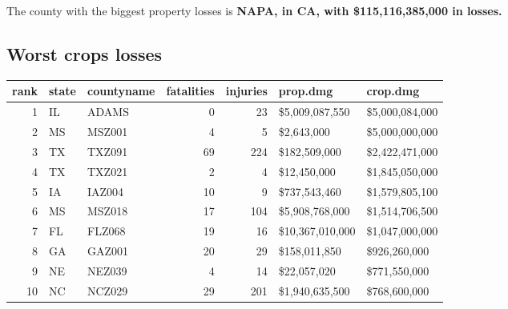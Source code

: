 \documentclass[]{article}
\newenvironment{Shaded}{\begin{snugshade}}{\end{snugshade}}
\newcommand{\KeywordTok}[1]{\textcolor[rgb]{0.13,0.29,0.53}{\textbf{{#1}}}}
\newcommand{\DataTypeTok}[1]{\textcolor[rgb]{0.13,0.29,0.53}{{#1}}}
\newcommand{\DecValTok}[1]{\textcolor[rgb]{0.00,0.00,0.81}{{#1}}}
\newcommand{\StringTok}[1]{\textcolor[rgb]{0.31,0.60,0.02}{{#1}}}
\newcommand{\CommentTok}[1]{\textcolor[rgb]{0.56,0.35,0.01}{\textit{{#1}}}}
\newcommand{\NormalTok}[1]{{#1}}
\begin{document}
The county with the biggest property losses is \textbf{NAPA, in CA, with
\$115,116,385,000 in losses.}

\subsection{Worst crops losses}\label{worst-crops-losses}

\begin{Shaded}
\end{Shaded}

\begin{longtable}[]{@{}rllrrll@{}}
\toprule
rank & state & countyname & fatalities & injuries & prop.dmg &
crop.dmg\tabularnewline
\midrule
\endhead
1 & IL & ADAMS & 0 & 23 & \$5,009,087,550 &
\$5,000,084,000\tabularnewline
2 & MS & MSZ001 & 4 & 5 & \$2,643,000 & \$5,000,000,000\tabularnewline
3 & TX & TXZ091 & 69 & 224 & \$182,509,000 &
\$2,422,471,000\tabularnewline
4 & TX & TXZ021 & 2 & 4 & \$12,450,000 & \$1,845,050,000\tabularnewline
5 & IA & IAZ004 & 10 & 9 & \$737,543,460 &
\$1,579,805,100\tabularnewline
6 & MS & MSZ018 & 17 & 104 & \$5,908,768,000 &
\$1,514,706,500\tabularnewline
7 & FL & FLZ068 & 19 & 16 & \$10,367,010,000 &
\$1,047,000,000\tabularnewline
8 & GA & GAZ001 & 20 & 29 & \$158,011,850 & \$926,260,000\tabularnewline
9 & NE & NEZ039 & 4 & 14 & \$22,057,020 & \$771,550,000\tabularnewline
10 & NC & NCZ029 & 29 & 201 & \$1,940,635,500 &
\$768,600,000\tabularnewline
\bottomrule
\end{longtable}
\end{document}
